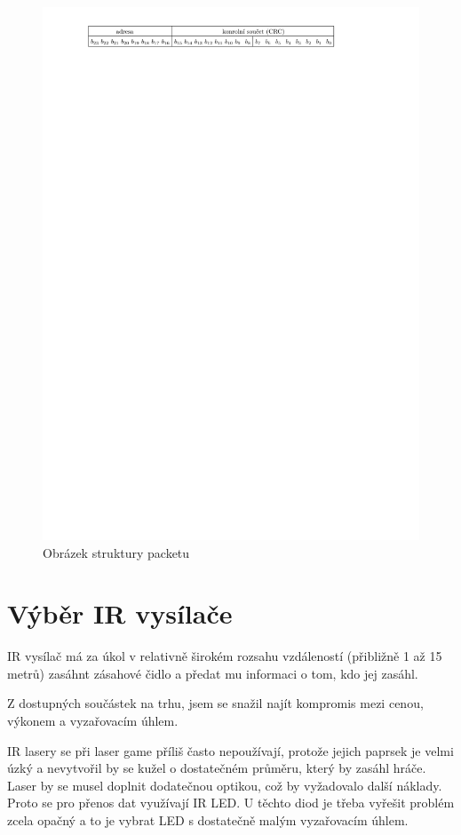 \begin{figure}[H]
    \begin{center}
        \includegraphics[width=\textwidth]{img/ir-packet}
    \end{center}
    \caption{Obrázek struktury packetu}
\end{figure}

\section{Výběr IR vysílače}
IR vysílač má za úkol v relativně širokém rozsahu vzdáleností (přibližně 1 až 15 metrů) zasáhnt zásahové čidlo a předat mu informaci o tom, kdo jej zasáhl.

Z dostupných součástek na trhu, jsem se snažil najít kompromis mezi cenou, výkonem a vyzařovacím úhlem.

IR lasery se při laser game příliš často nepoužívají, protože jejich paprsek je velmi úzký a nevytvořil by se kužel o dostatečném průměru, který by zasáhl hráče. Laser by se musel doplnit dodatečnou optikou, což by vyžadovalo další náklady. Proto se pro přenos dat využívají IR LED. U těchto diod je třeba vyřešit problém zcela opačný a to je vybrat LED s dostatečně malým vyzařovacím úhlem.

